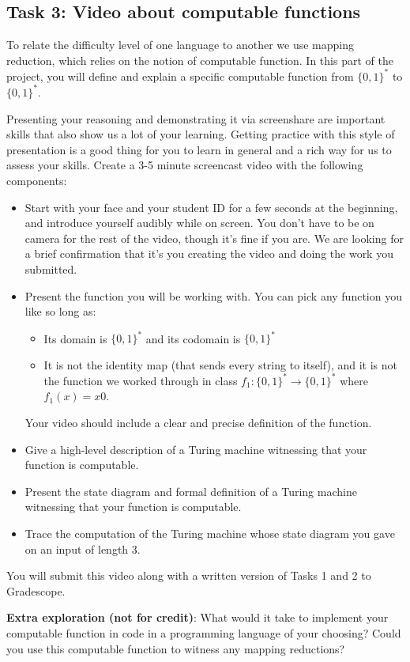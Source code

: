 		
\subsection*{Task 3: Video about computable functions}
To relate the difficulty level of one language to another we use mapping reduction, which relies
on the notion of computable function. In this part of the project, you will define and explain a specific 
computable function from $\{0,1\}^*$ to $\{0,1\}^*$.

 Presenting your reasoning and demonstrating it via screenshare are important skills that 
 also show us a lot of your learning. Getting practice with this style of presentation is a 
 good thing for you to learn in general and a rich way for us to assess your skills. Create 
 a 3-5 minute screencast video with the following components:
 \begin{itemize}
	\item Start with your face and your student ID for a few seconds at the beginning, and introduce yourself audibly while on screen. 
	You don't have to be on camera for the rest of the video, though it's fine if you are. 
	We are looking for a brief confirmation that it's you creating the video and 
	doing the work you submitted.
	\item Present the function you will be working with. You can pick any function you like so long as:
	\begin{itemize}
		\item Its domain is $\{0,1\}^*$ and its codomain is $\{0,1\}^*$
		\item It is not the identity map (that sends every string to itself), and it is not the function we 
		worked through in class $f_1: \{0,1\}^* \to \{0,1\}^*$ where $f_1(x) = x0$.
	\end{itemize}
	Your video should include a clear and precise definition of the function.
	\item Give a high-level description of a Turing machine witnessing that your function is computable.
	\item Present the state diagram and formal definition of a Turing machine witnessing that your function is computable.
	\item Trace the computation of the Turing machine whose state diagram you gave on an input of length $3$.
\end{itemize}
You will submit this video along with a written version of Tasks 1 and 2 to Gradescope.

{\bf Extra exploration (not for credit)}: What would it take to implement your computable function in code in a programming language
of your choosing? Could you use this computable function to witness any mapping reductions?

